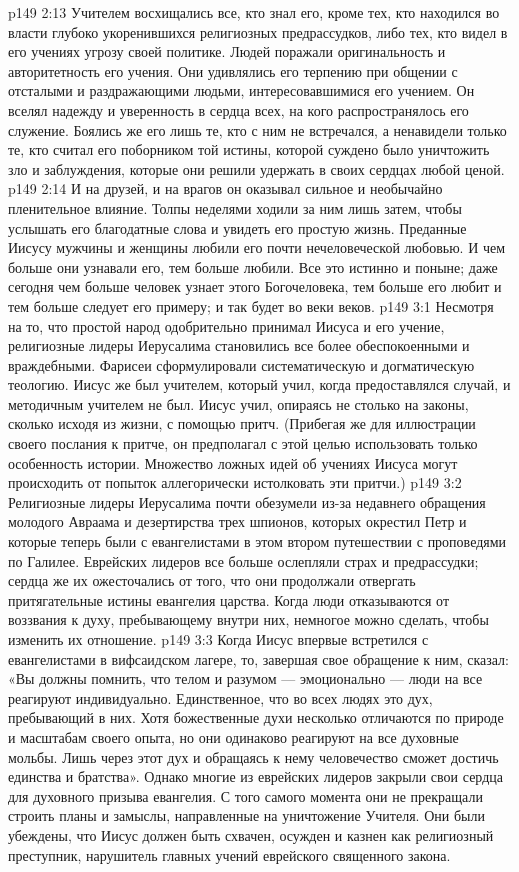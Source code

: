 \vs p149 2:13 Учителем восхищались все, кто знал его, кроме тех, кто находился во власти глубоко укоренившихся религиозных предрассудков, либо тех, кто видел в его учениях угрозу своей политике. Людей поражали оригинальность и авторитетность его учения. Они удивлялись его терпению при общении с отсталыми и раздражающими людьми, интересовавшимися его учением. Он вселял надежду и уверенность в сердца всех, на кого распространялось его служение. Боялись же его лишь те, кто с ним не встречался, а ненавидели только те, кто считал его поборником той истины, которой суждено было уничтожить зло и заблуждения, которые они решили удержать в своих сердцах любой ценой.
\vs p149 2:14 И на друзей, и на врагов он оказывал сильное и необычайно пленительное влияние. Толпы неделями ходили за ним лишь затем, чтобы услышать его благодатные слова и увидеть его простую жизнь. Преданные Иисусу мужчины и женщины любили его почти нечеловеческой любовью. И чем больше они узнавали его, тем больше любили. Все это истинно и поныне; даже сегодня чем больше человек узнает этого Богочеловека, тем больше его любит и тем больше следует его примеру; и так будет во веки веков.
\vs p149 3:1 Несмотря на то, что простой народ одобрительно принимал Иисуса и его учение, религиозные лидеры Иерусалима становились все более обеспокоенными и враждебными. Фарисеи сформулировали систематическую и догматическую теологию. Иисус же был учителем, который учил, когда предоставлялся случай, и методичным учителем не был. Иисус учил, опираясь не столько на законы, сколько исходя из жизни, с помощью притч. (Прибегая же для иллюстрации своего послания к притче, он предполагал с этой целью использовать только  особенность истории. Множество ложных идей об учениях Иисуса могут происходить от попыток аллегорически истолковать эти притчи.)
\vs p149 3:2 Религиозные лидеры Иерусалима почти обезумели из\hyp{}за недавнего обращения молодого Авраама и дезертирства трех шпионов, которых окрестил Петр и которые теперь были с евангелистами в этом втором путешествии с проповедями по Галилее. Еврейских лидеров все больше ослепляли страх и предрассудки; сердца же их ожесточались от того, что они продолжали отвергать притягательные истины евангелия царства. Когда люди отказываются от воззвания к духу, пребывающему внутри них, немногое можно сделать, чтобы изменить их отношение.
\vs p149 3:3 Когда Иисус впервые встретился с евангелистами в вифсаидском лагере, то, завершая свое обращение к ним, сказал: «Вы должны помнить, что телом и разумом --- эмоционально --- люди на все реагируют индивидуально. Единственное, что во всех людях  это дух, пребывающий в них. Хотя божественные духи несколько отличаются по природе и масштабам своего опыта, но они одинаково реагируют на все духовные мольбы. Лишь через этот дух и обращаясь к нему человечество сможет достичь единства и братства». Однако многие из еврейских лидеров закрыли свои сердца для духовного призыва евангелия. С того самого момента они не прекращали строить планы и замыслы, направленные на уничтожение Учителя. Они были убеждены, что Иисус должен быть схвачен, осужден и казнен как религиозный преступник, нарушитель главных учений еврейского священного закона.
